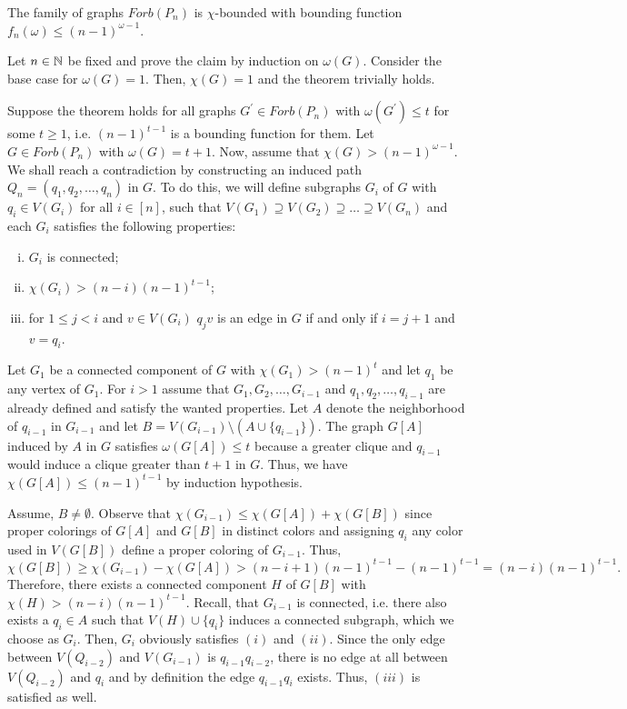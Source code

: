 \begin{thm}
The family of graphs $\textit{Forb}(P_n)$ is $\chi$-bounded with bounding function $f_n(\omega )\leq (n-1)^{\omega - 1}$.
\end{thm}

\begin{prf}
Let $n\in\mathbb{N}$ be fixed and prove the claim by induction on $\omega (G)$. Consider the base case for $\omega (G) =1$. Then, $\chi (G) = 1$ and the theorem trivially holds.

Suppose the theorem holds for all graphs $G^\prime\in\textit{Forb}(P_n)$ with $\omega (G^\prime ) \leq t$ for some $t\geq 1$, i.e. $(n-1)^{t-1}$ is a bounding function for them. Let $G\in\textit{Forb}(P_n)$ with $\omega (G) = t + 1$. Now, assume that $\chi (G) > (n-1)^{\omega - 1}$. We shall reach a contradiction by constructing an induced path $Q_n=(q_1,q_2,\dots ,q_n)$ in $G$. To do this, we will define subgraphs $G_i$ of $G$ with $q_i\in V(G_i)$ for all $i\in [n]$, such that $V(G_1)\supseteq V(G_2)\supseteq \dots\supseteq V(G_n)$ and each $G_i$ satisfies the following properties:
\begin{enumerate}[(i)]
\item $G_i$ is connected;
\item $\chi (G_i) > (n-i)(n-1)^{t-1}$;
\item for $1\leq j<i$ and $v\in V(G_i)$ $q_jv$ is an edge in $G$ if and only if $i=j+1$ and $v = q_i$.
\end{enumerate}
Let $G_1$ be a connected component of $G$ with $\chi (G_1) >(n-1)^t$ and let $q_1$ be any vertex of $G_1$. For $i>1$ assume that $G_1,G_2,\dots , G_{i-1}$ and $q_1,q_2,\dots , q_{i-1}$ are already defined and satisfy the wanted properties. Let $A$ denote the neighborhood of $q_{i-1}$ in $G_{i-1}$ and let $B=V(G_{i-1})\setminus (A\cup\{q_{i-1}\})$. The graph $G[A]$ induced by $A$ in $G$ satisfies $\omega (G[A])\leq t$ because a greater clique and $q_{i-1}$ would induce a clique greater than $t+1$ in $G$. Thus, we have $\chi (G[A])\leq (n-1)^{t-1}$ by induction hypothesis.

Assume, $B\neq\emptyset$. Observe that $\chi (G_{i-1})\leq \chi (G[A]) + \chi (G[B])$ since proper colorings of $G[A]$ and $G[B]$ in distinct colors and assigning $q_i$ any color used in $V(G[B])$ define a proper coloring of $G_{i-1}$. Thus, \[\chi (G[B])\geq \chi (G_{i-1})-\chi (G[A])>(n-i+1)(n-1)^{t-1}-(n-1)^{t-1}=(n-i)(n-1)^{t-1}.\]
Therefore, there exists a connected component $H$ of $G[B]$ with $\chi (H)>(n-i)(n-1)^{t-1}$. Recall, that $G_{i-1}$ is connected, i.e. there also exists a $q_i\in A$ such that $V(H)\cup \{q_i\}$ induces a connected subgraph, which we choose as $G_i$. Then,  $G_i$ obviously satisfies $(i)$ and $(ii)$. Since the only edge between $V(Q_{i-2})$ and $V(G_{i-1})$ is $q_{i-1}q_{i-2}$, there is no edge at all between $V(Q_{i-2})$ and $q_i$ and by definition the edge $q_{i-1}q_i$ exists. Thus, $(iii)$ is satisfied as well. 


\end{prf}
